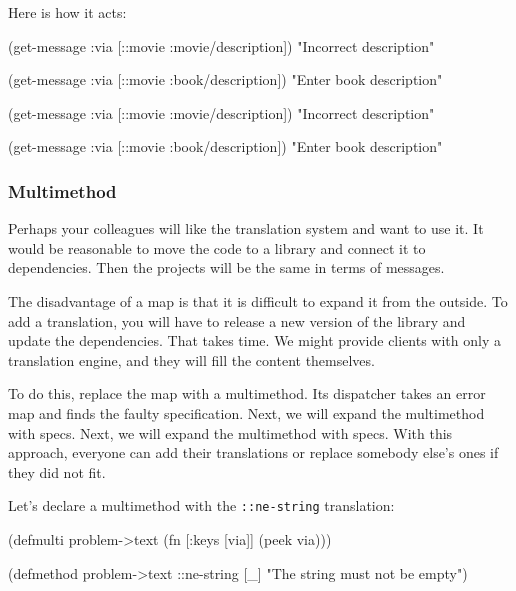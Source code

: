 \fi

\noindent
Here is how it acts:

\ifx\DEVICETYPE\MOBILE

  \begin{clojure}
(get-message
  {:via [::movie :movie/description]})
"Incorrect description"

(get-message
  {:via [::movie :book/description]})
"Enter book description"
  \end{clojure}

\else

  \begin{clojure}
(get-message {:via [::movie :movie/description]})
"Incorrect description"

(get-message {:via [::movie :book/description]})
"Enter book description"
  \end{clojure}

\fi

\subsubsection{Multimethod}

Perhaps your colleagues will like the translation system and want to use it. It would be reasonable to move the code to a library and connect it to dependencies. Then the projects will be the same in terms of messages.

The disadvantage of a map is that it is difficult to expand it from the outside. To add a translation, you will have to release a new version of the library and update the dependencies. That takes time. We might provide clients with only a translation engine, and they will fill the content themselves.

To do this, replace the map with a multimethod. Its dispatcher takes an error map and finds the faulty specification. Next, we will expand the multimethod with specs. Next, we will expand the multimethod with specs. With this approach, everyone can add their translations or replace somebody else's ones if they did not fit.

Let's declare a multimethod with the \texttt{::ne\--string} translation:


  \begin{clojure}
(defmulti problem->text
  (fn [{:keys [via]}]
    (peek via)))

(defmethod problem->text ::ne-string [_]
  "The string must not be empty")
  \end{clojure}


